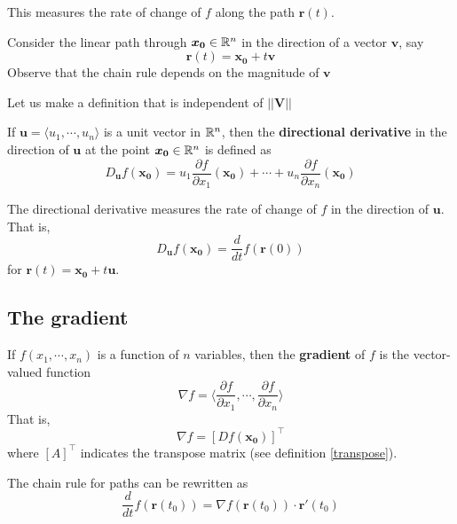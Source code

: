 This measures the rate of change of $f$ along the path $\bm{r}(t)$.




\begin{example}
    Consider the linear path through $\bm{x_0} \in \mathbb{R}^n$ in the direction of a vector $\bm{v}$, say $$\bm{r}(t) = \bm{x_0} + t\bm{v}$$  Observe that the chain rule depends on the magnitude of $\bm{v}$

\end{example}

Let us make a definition that is independent of $||\bm{V}||$

\begin{definition}
    If $\bm{u} = \langle u_1, \cdots, u_n \rangle$ is a unit vector in $\mathbb{R}^n$, then the \textbf{directional derivative}
    in the direction of $\bm{u}$ at the point $\bm{x_0} \in \mathbb{R}^n$ is defined as
    $$D_{\bm{u}} f(\bm{x_0}) = u_1\frac{\partial f}{\partial x_1}(\bm{x_0}) + \cdots + u_n\frac{\partial f}{\partial x_n}(\bm{x_0})$$
    \end{definition}

The directional derivative measures the rate of change of $f$ in the direction of $\bm{u}$.  That is, $$D_{\bm{u}} f(\bm{x_0}) = \frac{d}{dt}f(\bm{r}(0))$$ for $\bm{r}(t) = \bm{x_0} + t\bm{u}$.


\begin{example}
    
\end{example}



\subsection{The gradient}


\begin{definition}
    If $f(x_1,\cdots,x_n)$ is a function of $n$ variables, then the \textbf{gradient} of $f$ is the vector-valued function 
    $$\nabla f = \langle \frac{\partial f}{\partial x_1} , \cdots, \frac{\partial f}{\partial x_n} \rangle$$
    That is, $$\nabla f = [Df(\bm{x_0})]^\intercal$$
    where $[A]^\intercal$ indicates the transpose matrix (see definition \ref{transpose}).
    \end{definition}


    
    \begin{proposition}
    The chain rule for paths can be rewritten as
    $$\frac{d}{dt}f(\bm{r}(t_0))= \nabla f(\bm{r}(t_0)) \cdot \bm{r}'(t_0)$$
    
    \end{proposition}

